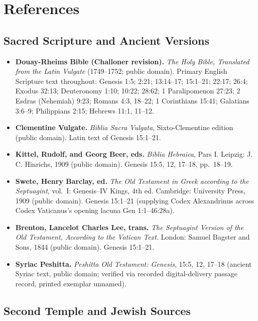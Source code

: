 \section{References}

\subsection*{Sacred Scripture and Ancient Versions}

\begin{itemize}
\item \textbf{Douay-Rheims Bible (Challoner revision).} \emph{The Holy Bible, Translated from the Latin Vulgate} (1749--1752; public domain). Primary English Scripture text throughout: Genesis 1:5; 2:21; 13:14--17; 15:1--21; 22:17; 26:4; Exodus 32:13; Deuteronomy 1:10; 10:22; 28:62; 1 Paralipomenon 27:23; 2 Esdras (Nehemiah) 9:23; Romans 4:3, 18--22; 1 Corinthians 15:41; Galatians 3:6--9; Philippians 2:15; Hebrews 11:1, 11--12.
\item \textbf{Clementine Vulgate.} \emph{Biblia Sacra Vulgata}, Sixto-Clementine edition (public domain). Latin text of Genesis 15:1--21.
\item \textbf{Kittel, Rudolf, and Georg Beer, eds.} \emph{Biblia Hebraica}, Pars I. Leipzig: J. C. Hinrichs, 1909 (public domain). Genesis 15:5, 12, 17--18, pp.~18--19.
\item \textbf{Swete, Henry Barclay, ed.} \emph{The Old Testament in Greek according to the Septuagint}, vol.~I: Genesis--IV Kings, 4th ed. Cambridge: University Press, 1909 (public domain). Genesis 15:1--21 (supplying Codex Alexandrinus across Codex Vaticanus's opening lacuna Gen 1:1--46:28a).
\item \textbf{Brenton, Lancelot Charles Lee, trans.} \emph{The Septuagint Version of the Old Testament, According to the Vatican Text}. London: Samuel Bagster and Sons, 1844 (public domain). Genesis 15:1--21.
\item \textbf{Syriac Peshitta.} \emph{Peshitta Old Testament: Genesis}, 15:5, 12, 17--18 (ancient Syriac text, public domain; verified via recorded digital-delivery passage record, printed exemplar unnamed).
\end{itemize}

\subsection*{Second Temple and Jewish Sources}

